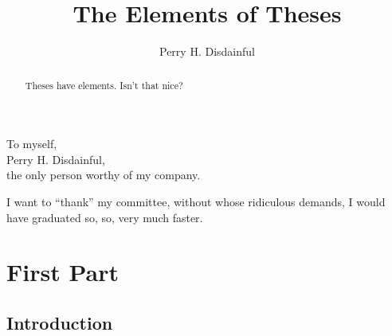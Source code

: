\documentclass[11pt]{ucthesis}
\begin{document}

\title{The Elements of Theses}
\author{Perry H. Disdainful}
\deanlinethree{}

\begin{frontmatter}

\maketitle
\copyrightpage

\tableofcontents
\listoffigures
\listoftables

\begin{abstract}
Theses have elements.  Isn't that nice?

\end{abstract}

\begin{dedication}
\null\vfil
{\large
\begin{center}
To myself,\\\vspace{12pt}
Perry H. Disdainful,\\\vspace{12pt}
the only person worthy of my company.
\end{center}}
\vfil\null
\end{dedication}


\begin{acknowledgements}
I want to ``thank'' my committee, without whose ridiculous demands, I
would have graduated so, so, very much faster.
\end{acknowledgements}

\end{frontmatter}

\part{First Part}

\chapter{Introduction}
\end{document}
